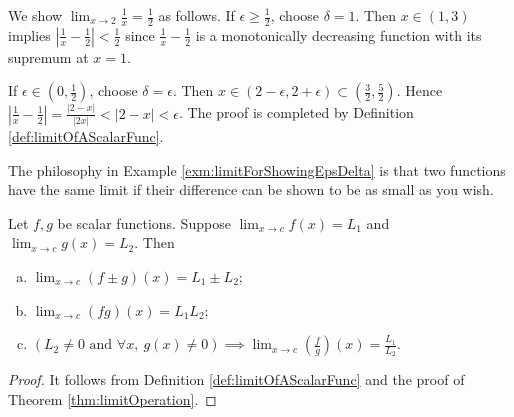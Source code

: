 \begin{exm}
  \label{exm:limitForShowingEpsDelta}
   We show $\lim_{x\rightarrow 2}\frac{1}{x}= \frac{1}{2}$ as follows.
   If $\epsilon\ge \frac{1}{2}$,
   choose $\delta=1$.
   Then $x\in(1,3)$ implies
   $\left|\frac{1}{x}-\frac{1}{2}\right|<\frac{1}{2}$
   since $\frac{1}{x}-\frac{1}{2}$
   is a monotonically decreasing function
   with its supremum at $x=1$.

  If $\epsilon\in (0,\frac{1}{2})$,
   choose $\delta=\epsilon$.
  Then $x\in (2-\epsilon,2+\epsilon)\subset
  (\frac{3}{2},\frac{5}{2})$.
  Hence
  $\left|\frac{1}{x}-\frac{1}{2}\right|=\frac{|2-x|}{|2x|}<|2-x|<\epsilon$.
  The proof is completed by Definition \ref{def:limitOfAScalarFunc}.
\end{exm}

\begin{rem}
  The philosophy in Example \ref{exm:limitForShowingEpsDelta}
  is that two functions have the same limit
  if their difference can be shown to be as small as you wish.
\end{rem}

\begin{thm}
  \label{thm:funcLimitOperation}
  Let $f,g$ be scalar functions.
  Suppose $\lim_{x\rightarrow c}f(x)=L_{1}$ and
  $\lim_{x\rightarrow c}g(x)=L_{2}$. Then
  \begin{enumerate}[(a)]
  \item $\lim_{x\rightarrow c}(f\pm g)(x)=L_{1}\pm L_{2}$;
  \item $\lim_{x\rightarrow c}(fg)(x)=L_{1}L_{2}$;
  \item $(L_{2}\neq 0\text{ and }\forall x,\ g(x)\neq 0)
    \implies
    \lim_{x\rightarrow c}(\frac{f}{g})(x)=\frac{L_{1}}{L_{2}}$.
  \end{enumerate}
\end{thm}
\begin{proof}
  It follows from Definition \ref{def:limitOfAScalarFunc}
  and the proof of Theorem \ref{thm:limitOperation}.
\end{proof}

